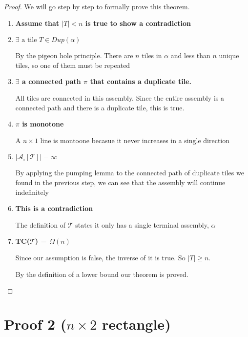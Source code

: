 \documentclass[12pt]{article}
\begin{document}
\begin{proof}
	We will go step by step to formally prove this theorem.

	\begin{enumerate}
		\item \textbf{Assume that $|T| < n$ is true to show a contradiction}

		\item \textbf{$\exists \text{ a tile } T \in Dup(\alpha)$ }

		By the pigeon hole principle. There are $n$ tiles in $\alpha$ and less than $n$ unique tiles, so one of them must be repeated

		\item \textbf{$\exists$ a connected path $\pi$ that contains a duplicate tile.}

		All tiles are connected in this assembly. Since the entire assembly is a connected path and there is a duplicate tile, this is true.

        \item \textbf{$\pi$ is monotone}

        A $n \times 1$ line is montoone becasue it never increases in a single direction


		\item \textbf{$|\mathcal{A}_\square[\mathcal{T}]| = \infty$}

		By applying the pumping lemma to the connected path of duplicate tiles we found in the previous step, we can see that the assembly will continue indefinitely

		\item \textbf{This is a contradiction}

		The definition of $\mathcal{T}$ states it only has a single terminal assembly, $\alpha$

		\item \textbf{TC($\mathcal{T}$) = $\Omega(n)$}

		Since our assumption is false, the inverse of it is true. So $|T| \geq n$.

		By the definition of a lower bound our theorem is proved.

	\end{enumerate}



\end{proof}

\section*{Proof 2 ($n \times 2 $ rectangle)}
\end{document}
